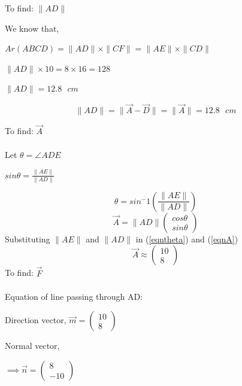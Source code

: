 \documentclass[letterpaper,12pt]{article}
\begin{document}
To find: $\|AD\|$

We know that,
\begin{center}
    $Ar(ABCD) = \|AD\|\times\|CF\| = \|AE\|\times\|CD\|$ \\
\end{center}
\begin{center}
    $\|AD\| \times 10 = 8 \times 16 = 128$
\end{center}
\begin{center}
    $\|AD\| = 12.8 \text{ } cm$
\end{center}
\begin{equation}
\nonumber
    \|AD\| = \|\Vec{A} - \Vec{D}\| = \|\Vec{A}\| = 12.8 \text{ } cm
\end{equation}

To find: $\Vec{A}$ \\ \\
Let $\theta = \angle ADE$
\begin{center}
    $sin \theta = \frac{\|AE\|}{\|AD\|}$
\end{center}
\begin{equation}
    \theta = sin^-1\left(\frac{\|AE\|}{\|AD\|}\right)
\label{eqntheta}
\end{equation}
\begin{equation}
    \Vec{A} = \|AD\|\begin{pmatrix} cos \theta \\ sin \theta \end{pmatrix}
\label{eqnA}
\end{equation}
Substituting $\|AE\|$ and $\|AD\|$ in (\ref*{eqntheta}) and (\ref*{eqnA})
\begin{equation}
    \Vec{A} \approx \begin{pmatrix} 10 \\ 8 \end{pmatrix}
\end{equation}
To find: $\Vec{F}$ \\ \\
Equation of line passing through AD:
\begin{center}
    Direction vector, $\Vec{m} = \begin{pmatrix} 10 \\ 8 \end{pmatrix}$
\end{center}
Normal vector,
\begin{center}
    $\implies \Vec{n} = \begin{pmatrix} 8 \\ -10 \end{pmatrix}$
\end{center}
\end{document}
